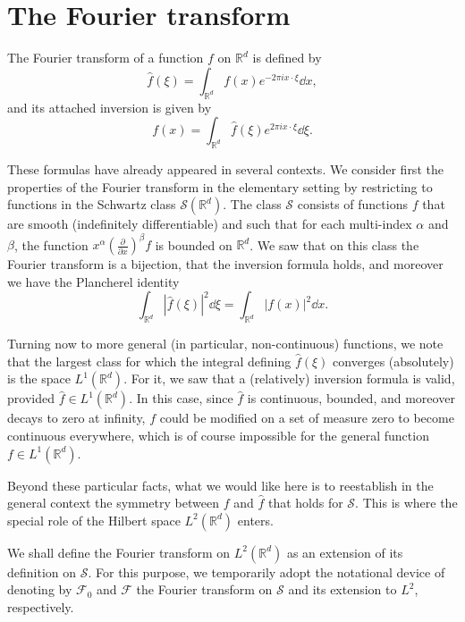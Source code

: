\chapter{The Fourier transform}

The Fourier transform of a function $f$ on $\mathbb R^d$ is defined by 
\begin{equation}
  \hat f(\xi) = \int_{\mathbb R^d}f(x)e^{-2\pi ix\cdot\xi}\dd x,
\end{equation}
and its attached inversion is given by 
\begin{equation}
  f(x) = \int_{\mathbb R^d}\hat f(\xi)e^{2\pi ix\cdot\xi}\dd \xi.
\end{equation}

These formulas have already appeared in several contexts.
We consider first the properties of the Fourier transform in the elementary setting 
by restricting to functions in the Schwartz class $\mathcal S(\mathbb R^d)$.
The class $\mathcal S$ consists of functions $f$ that are smooth (indefinitely differentiable)
and such that for each multi-index $\alpha$ and $\beta$, the function $x^\alpha\left(\frac{\partial}{\partial x} \right)^\beta f$ is bounded on $\mathbb R^d$.
We saw that on this class the Fourier transform is a bijection,
that the inversion formula holds,
and moreover we have the Plancherel identity 
\begin{equation}
  \int_{\mathbb R^d}|\hat f(\xi)|^2\dd\xi = \int_{\mathbb R^d}|f(x)|^2\dd x.
\end{equation}

Turning now to more general (in particular, non-continuous) functions,
we note that the largest class for which the integral defining $\hat f(\xi)$ converges (absolutely) is the space $L^1(\mathbb R^d)$. 
For it, we saw that a (relatively) inversion formula is valid, 
provided $\hat f\in L^1(\mathbb R^d)$. 
In this case, 
since $\hat f$ is continuous, bounded, and moreover decays to zero at infinity,
$f$ could be modified on a set of measure zero to become continuous everywhere,
which is of course impossible for the general function $f\in L^1(\mathbb R^d)$.

Beyond these particular facts, what we would like here is to reestablish in the general context the symmetry between $f$ and $\hat f$ that holds for $\mathcal S$.
This is where the special role of the Hilbert space $L^2(\mathbb R^d)$ enters.

We shall define the Fourier transform on $L^2(\mathbb R^d)$ as an extension of its definition on $\mathcal S$.
For this purpose, we temporarily adopt the notational device of denoting by $\mathcal F_0$ and $\mathcal F$ the Fourier transform on $\mathcal S$ and its extension to $L^2$, respectively.

